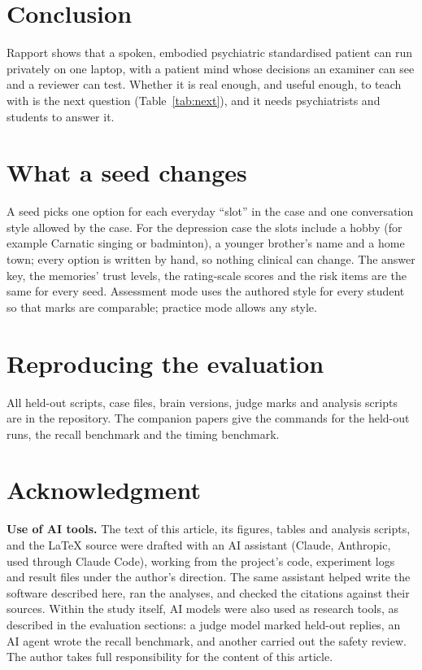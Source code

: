 \documentclass[journal]{IEEEtran}
\begin{document}
\section{Conclusion}
Rapport shows that a spoken, embodied psychiatric standardised patient can run privately on one laptop, with a patient mind whose decisions an examiner
can see and a reviewer can test. Whether it is real enough, and useful enough, to teach with is the next question (Table~\ref{tab:next}), and it needs
psychiatrists and students to answer it.

\appendices
\section{What a seed changes}
A seed picks one option for each everyday ``slot'' in the case and one conversation style allowed by the case. For the depression case the slots
include a hobby (for example Carnatic singing or badminton), a younger brother's name and a home town; every option is written by hand, so
nothing clinical can change. The answer key, the memories' trust levels, the rating-scale scores and the risk items are the same for every seed.
Assessment mode uses the authored style for every student so that marks are comparable; practice mode allows any style.

\section{Reproducing the evaluation}
All held-out scripts, case files, brain versions, judge marks and analysis scripts are in the repository. The companion papers give the commands
for the held-out runs, the recall benchmark and the timing benchmark.

\section*{Acknowledgment}
\textbf{Use of AI tools.} The text of this article, its figures, tables and analysis scripts, and the \LaTeX{} source were
drafted with an AI assistant (Claude, Anthropic, used through Claude Code), working from the project's code, experiment logs and result
files under the author's direction. The same assistant helped write the software described here, ran the analyses, and checked the
citations against their sources. Within the study itself, AI models were also used as research tools, as described in the evaluation sections: a judge model marked held-out replies, an AI agent wrote the recall benchmark, and another carried out the safety review. The author takes full responsibility for the content of this article.



\end{document}
